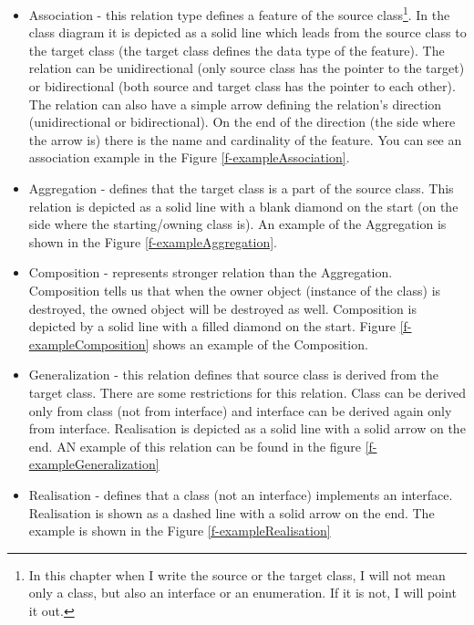 \begin{itemize}
    \item Association - this relation type defines a feature of the source class\footnote{In this chapter when I write the source or the target class, I will not mean only a class, but also an interface or an enumeration. If it is not, I will point it out.}. In the class diagram it is depicted as a solid line which leads from the source class to the target class (the target class defines the data type of the feature). The relation can be unidirectional (only source class has the pointer to the target) or bidirectional (both source and target class has the pointer to each other). The relation can also have a simple arrow defining the relation's direction (unidirectional or bidirectional). On the end of the direction (the side where the arrow is) there is the name and cardinality of the feature. You can see an association example in the Figure \ref{f-exampleAssociation}.
    \item Aggregation - defines that the target class is a part of the source class. This relation is depicted as a solid line with a blank diamond on the start (on the side where the starting/owning class is). An example of the Aggregation is shown in the Figure \ref{f-exampleAggregation}.
    \item Composition - represents stronger relation than the Aggregation. Composition tells us that when the owner object (instance of the class) is destroyed, the owned object will be destroyed as well. Composition is depicted by a solid line with a filled diamond on the start. Figure \ref{f-exampleComposition} shows an example of the Composition.
    \item Generalization - this relation defines that source class is derived from the target class. There are some restrictions for this relation. Class can be derived only from class (not from interface) and interface can be derived again only from interface. Realisation is depicted as a solid line with a solid arrow on the end. AN example of this relation can be found in the figure \ref{f-exampleGeneralization}
    \item Realisation - defines that a class (not an interface) implements an interface. Realisation is shown as a dashed line with a solid arrow on the end. The example is shown in the Figure \ref{f-exampleRealisation}
\end{itemize}

